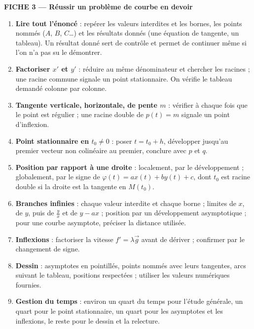 \documentclass[a4paper,11pt]{article}
\numberwithin{equation}{section}
\numberwithin{figure}{section}
\numberwithin{table}{section}
\theoremstyle{enonce}
\theoremstyle{exemple}
\theoremstyle{remarque}
\newcommand{\ve}[1]{\vec{#1}}
\begin{document}
\begin{tcolorbox}[enhanced,breakable,colback=white,colframe=Bleu,boxrule=0.6pt,arc=0pt,left=10pt,right=10pt,top=8pt,bottom=8pt]
\label{fiche:3}{\sffamily\bfseries\color{Bleu}FICHE 3 --- Réussir un problème de courbe en devoir}\par\medskip
\begin{enumerate}[leftmargin=1.4em,itemsep=0.35em]
\item \textbf{Lire tout l'énoncé} : repérer les valeurs interdites et les bornes, les points nommés ($A$, $B$, $C$\dots) et
      les résultats donnés (une équation de tangente, un tableau). Un résultat donné sert de contrôle et permet de continuer
      même si l'on n'a pas su le démontrer.
\item \textbf{Factoriser $x'$ et $y'$} : réduire au même dénominateur et chercher les racines ; une racine commune signale un
      point stationnaire. On vérifie le tableau demandé colonne par colonne.
\item \textbf{Tangente verticale, horizontale, de pente $m$} : vérifier à chaque fois que le point est régulier ; une racine
      double de $p(t)=m$ signale un point d'inflexion.
\item \textbf{Point stationnaire en $t_0\neq0$} : poser $t=t_0+h$, développer jusqu'au premier vecteur non colinéaire au
      premier, conclure avec $p$ et $q$.
\item \textbf{Position par rapport à une droite} : localement, par le développement ; globalement, par le signe de
      $\varphi(t)=ax(t)+by(t)+c$, dont $t_0$ est racine double si la droite est la tangente en $M(t_0)$.
\item \textbf{Branches infinies} : chaque valeur interdite et chaque borne ; limites de $x$, de $y$, puis de $\frac yx$ et
      de $y-ax$ ; position par un développement asymptotique ; pour une courbe asymptote, préciser la distance utilisée.
\item \textbf{Inflexions} : factoriser la vitesse $f'=\lambda\ve g$ avant de dériver ; confirmer par le changement de signe.
\item \textbf{Dessin} : asymptotes en pointillés, points nommés avec leurs tangentes, arcs suivant le tableau, positions
      respectées ; utiliser les valeurs numériques fournies.
\item \textbf{Gestion du temps} : environ un quart du temps pour l'étude générale, un quart pour le point stationnaire,
      un quart pour les asymptotes et les inflexions, le reste pour le dessin et la relecture.
\end{enumerate}
\end{tcolorbox}
\end{document}
